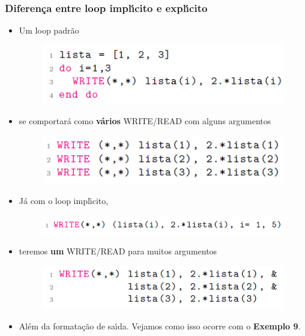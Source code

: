 \documentclass[notes=show]{beamer}
\newenvironment{stepitemize}{\begin{itemize}[<+->]}{\end{itemize} }
\begin{document}
\begin{frame}%

\frametitle{Diferen\c{c}a entre loop impl\'{\i}cito e expl\'{\i}cito}

\begin{stepitemize}
\item Um loop padr\~{a}o
\begin{figure}
	\includegraphics[scale=.5]{script1}
\end{figure} 

\item se comportar\'{a} como \textbf{v\'{a}rios} WRITE/READ com alguns
argumentos

\begin{figure}
	\includegraphics[scale=.5]{script2}
\end{figure} 

\item J\'{a} com o loop impl\'{\i}cito,
\begin{figure}
	\includegraphics[scale=.5]{script3}
\end{figure}

\item teremos \textbf{um} WRITE/READ para muitos argumentos
\begin{figure}
	\includegraphics[scale=.5]{script4}
\end{figure}

\item Al\'{e}m da formata\c{c}\~{a}o de sa\'{\i}da. Vejamos como isso ocorre
com o \textbf{Exemplo 9}.
\end{stepitemize}

\transboxout%
\end{frame}%
\end{document}
